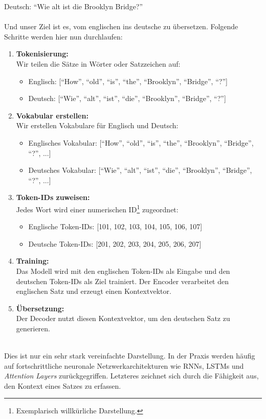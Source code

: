 \documentclass[12pt,a4paper]{article}
\begin{document}
Deutsch: \enquote{Wie alt ist die Brooklyn Bridge?}
\\ \\
Und unser Ziel ist es, vom englischen ins deutsche zu übersetzen. Folgende Schritte werden hier nun durchlaufen: \\
\begin{enumerate}
	\item \textbf{Tokenisierung:} \\
	Wir teilen die Sätze in Wörter oder Satzzeichen auf:
	\begin{itemize}
		\item Englisch: [\enquote{How}, \enquote{old}, \enquote{is}, \enquote{the}, \enquote{Brooklyn}, \enquote{Bridge}, \enquote{?}]
		\item Deutsch: [\enquote{Wie}, \enquote{alt}, \enquote{ist}, \enquote{die}, \enquote{Brooklyn}, \enquote{Bridge}, \enquote{?}]
	\end{itemize}
	
	\item \textbf{Vokabular erstellen:} \\
	Wir erstellen Vokabulare für Englisch und Deutsch:
	\begin{itemize}
		\item Englisches Vokabular: [\enquote{How}, \enquote{old}, \enquote{is}, \enquote{the}, \enquote{Brooklyn}, \enquote{Bridge}, \enquote{?}, ...]
		\item Deutsches Vokabular: [\enquote{Wie}, \enquote{alt}, \enquote{ist}, \enquote{die}, \enquote{Brooklyn}, \enquote{Bridge}, \enquote{?}, ...]
	\end{itemize}
	
	\item \textbf{Token-IDs zuweisen:} \\
	Jedes Wort wird einer numerischen ID\footnote{Exemplarisch willkürliche Darstellung.} zugeordnet:
	\begin{itemize}
		\item Englische Token-IDs: [101, 102, 103, 104, 105, 106, 107]
		\item Deutsche Token-IDs: [201, 202, 203, 204, 205, 206, 207]
	\end{itemize}
	
	\item \textbf{Training:} \\
	Das Modell wird mit den englischen Token-IDs als Eingabe und den deutschen Token-IDs als Ziel trainiert. Der Encoder verarbeitet den englischen Satz und erzeugt einen Kontextvektor. 
	
	\item \textbf{Übersetzung:} \\
	Der Decoder nutzt diesen Kontextvektor, um den deutschen Satz zu generieren.
\end{enumerate}
\ \\
Dies ist nur ein sehr stark vereinfachte Darstellung. In der Praxis werden häufig auf fortschrittliche neuronale Netzwerkarchitekturen wie RNNs, LSTMs und \textit{Attention Layers} zurückgegriffen. Letzteres zeichnet sich durch die Fähigkeit aus, den Kontext eines Satzes zu erfassen.
\end{document}
